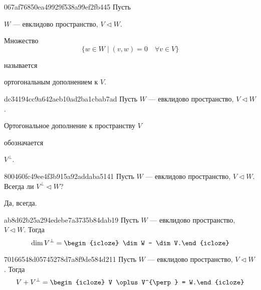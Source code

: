\begin{note}{067af76850ea49929f538a99ef2fb445}
    Пусть \begin{icloze}{3}\({ W }\) --- евклидово пространство, \({ V \triangleleft W }\).\end{icloze}
    \begin{icloze}{1}
        Множество
        \[
            \Big\{ w \in W \mid (v, w) = 0 \quad \forall v \in V \Big\}
        \]
    \end{icloze}
    называется \begin{icloze}{2}ортогональным дополнением к \({ V }\).\end{icloze}
\end{note}

\begin{note}{dc34194cc9a642aeb10ad2ba1cbab7ad}
    Пусть \({ W }\) --- евклидово пространство, \({ V \triangleleft W }\).
    \begin{icloze}{1}Ортогональное дополнение к пространству \({ V }\)\end{icloze} обозначается \begin{icloze}{2}\({ V^{\perp} }\).\end{icloze}
\end{note}

\begin{note}{800460fc49ee4f3b915a92addaba5141}
    Пусть \({ W }\) --- евклидово пространство, \({ V \triangleleft W }\).
    Всегда ли \({ V^{\perp} \triangleleft W }\)?

    \begin{cloze}{1}
        Да, всегда.
    \end{cloze}
\end{note}

\begin{note}{ab8d62b25a294edebe7a3735b84dab19}
    Пусть \({ W }\) --- евклидово пространство, \({ V \triangleleft W }\).
    Тогда
    \[
        \dim V^{\perp} = \begin{icloze}{1}\dim W - \dim V.\end{icloze}
    \]
\end{note}

\begin{note}{70166548d05745278d7a8f9de584d211}
    Пусть \({ W }\) --- евклидово пространство, \({ V \triangleleft W }\).
    Тогда
    \[
        V + V^{\perp} = \begin{icloze}{1}V \oplus V^{\perp} = W.\end{icloze}
    \]
\end{note}

